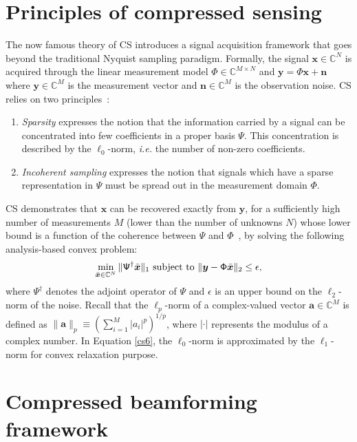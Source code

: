 \documentclass[conference]{IEEEtran}
\begin{document}
\section{Principles of compressed sensing}
\label{sec:CS}
The now famous theory of CS introduces a signal acquisition framework that goes beyond the traditional Nyquist sampling paradigm\cite{fornasier11}.
Formally, the signal $\bm{x} \in \mathbb{C}^N$ is acquired through the linear measurement model $\mathsf{\Phi} \in \mathbb{C}^{M \times N}$ and $\bm{y} = \mathsf{\Phi} \bm{x} + \bm{n}$ where $\bm{y} \in \mathbb{C}^M$ is the measurement vector and $\bm{n} \in \mathbb{C}^M$ is the observation noise. CS relies on two principles~\cite{Candes_SPM_2008}:
\begin{enumerate}
	\item \textit{Sparsity} expresses the notion that the information carried by a signal can be concentrated into few coefficients in a proper basis $\mathsf{\Psi}$. This concentration is described by the $\ell_0$-norm, \textit{i.e.} the number of non-zero coefficients.
	\item \textit{Incoherent sampling} expresses the notion that signals which have a sparse representation in $\mathsf{\Psi}$ must be spread out in the measurement domain $\mathsf{\Phi}$. 
\end{enumerate}
CS demonstrates that $\bm{x}$ can be recovered exactly from $\bm{y}$, for a sufficiently high number of measurements $M$ (lower than the number of unknowns $N$) whose lower bound is a function of the coherence between $\mathsf{\Psi}$ and $\mathsf{\Phi}$~\cite{Candes_IP_2007}, by solving the following analysis-based convex problem:
\begin{equation}\label{cs6}
\min_{\bar{\bm{x}}\in\mathbb{C}^{N}}\|\mathsf{\Psi}^{\dagger}\bar{\bm{x}}\|_{1}
\textnormal{ subject to }\| \bm{y}-\mathsf{\Phi}\bar{\bm{x}}\|_{2}\leq\epsilon,
\end{equation}
%
where $\mathsf{\Psi}^{\dagger}$ denotes the adjoint operator of $\mathsf{\Psi}$ and $\epsilon$ is an upper bound on the $\ell_{2}$-norm of the noise. Recall that the $\ell_{p}$-norm of a complex-valued vector $\bm{a}\in\mathbb{C}^{M}$ is defined as $\| \bm{a}\|_{p}\equiv(\sum_{i=1}^{M}|a_{i}|^{p})^{1/p}$, where $|\cdot|$ represents the modulus of a complex number. In Equation \eqref{cs6}, the $\ell_0$-norm is approximated by the $\ell_1$-norm for convex relaxation purpose.
\section{Compressed beamforming framework}
\label{sec:CB}
\end{document}
